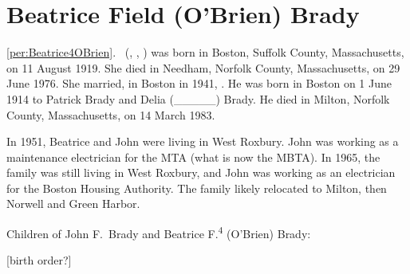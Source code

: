 \section{Beatrice Field (O'Brien) Brady}

\ref{per:Beatrice4OBrien}.\  (, , ) was born in Boston, Suffolk County, Massachusetts, on 11 August 1919.\cite{Beatrice4OBrienBirth} She died in Needham, Norfolk County, Massachusetts, on 29 June 1976.\cite{Beatrice4OBrienDeath} She married, in Boston in 1941, .\cite{Beatrice4OBrienMarriage} He was born in Boston on 1 June 1914 to Patrick Brady and Delia (\_\_\_\_\_) Brady.\cite{JohnBradyDraft,Census1920JohnBrady} He died in Milton, Norfolk County, Massachusetts, on 14 March 1983.\cite{JohnBradyDeath}

In 1951, Beatrice and John were living in West Roxbury. John was working as a maintenance electrician for the MTA (what is now the MBTA).\cite{JohnBrady1951,HistoryoftheT} In 1965, the family was still living in West Roxbury, and John was working as an electrician for the Boston Housing Authority.\cite{JohnBrady1965} The family likely relocated to Milton, then Norwell and Green Harbor.\cite{Beatrice4OBrienObit}

\begin{KidsIntro}
	Children of John F.\ Brady and Beatrice F.\textsuperscript{4} (O'Brien) Brady:
\end{KidsIntro}

\begin{Kids}
	
	
	
\end{Kids}

[birth order?]
